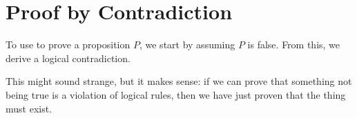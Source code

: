 %
%
%
%
%
%
%
%
%

\section{Proof by Contradiction}

To use  to prove a proposition $P$,
we start by assuming $P$ is false.
From this, we derive a logical contradiction.

This might sound strange, but it makes sense: if we can prove that something not
being true is a violation of logical rules, then we have just proven that the
thing must exist.

